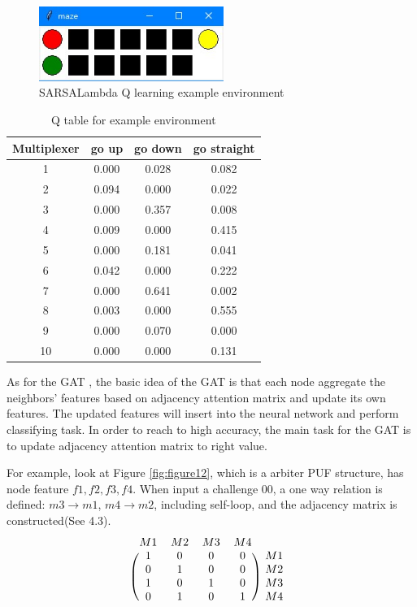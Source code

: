 \begin{figure}[htp]
    \centering
    \includegraphics[width=6cm]{figures/figure11.jpg}
    \caption{SARSALambda Q learning example environment}
    \label{fig:figure11}
    \end{figure}

\begin{table}[ht]
    \center
    \begin{tabular}{c|ccc}
    Multiplexer & go up & go down & go straight\\
    \hline
    1 & 0.000 & 0.028 & 0.082\\
    2 & 0.094 & 0.000 & 0.022\\
    3 & 0.000 & 0.357 & 0.008\\
    4 & 0.009 & 0.000 & 0.415\\
    5 & 0.000 & 0.181 & 0.041\\
    6 & 0.042 & 0.000 & 0.222\\
    7 & 0.000 & 0.641 & 0.002\\
    8 & 0.003 & 0.000 & 0.555\\
    9 & 0.000 & 0.070 & 0.000\\
    10 & 0.000 & 0.000 & 0.131\\
    \end{tabular}
    \caption{Q table for example environment}
    \label{tab:table1}
    \end{table}

As for the GAT \cite{Reference10}, the basic idea of the GAT is that each node aggregate the neighbors' features based on adjacency attention matrix and update its own features. 
The updated features will insert into the neural network and perform classifying task. In order to reach to high accuracy, the main task for the GAT is to update adjacency attention matrix to
right value.

For example, look at Figure \ref{fig:figure12}, which is a arbiter PUF structure, has node feature $f1,f2,f3,f4$. When input a challenge 00, a one way relation is defined: 
$m3 \rightarrow m1$, $m4 \rightarrow m2$, including self-loop, and the adjacency matrix is constructed(See 4.3). 
\begin{equation}
    \begin{blockarray}{ccccc}
    M1 & M2 & M3 & M4\\
    \begin{block}{(cccc)c}
        1 & 0 & 0 & 0 & M1\\
        0 & 1 & 0 & 0 & M2\\
        1 & 0 & 1 & 0 & M3\\
        0 & 1 & 0 & 1 & M4\\
    \end{block}
    \end{blockarray}
    \label{matrix}
\end{equation}

